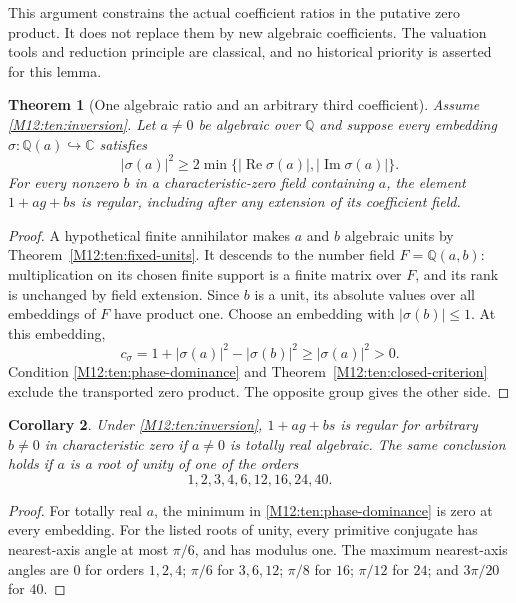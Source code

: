 \documentclass[11pt,a4paper,oneside]{report}
\newtheorem{theorem}{Theorem}[section]
\newtheorem{corollary}[theorem]{Corollary}
\theoremstyle{definition}
\theoremstyle{remark}
\begin{document}
This argument constrains the actual coefficient ratios in the
putative zero product. It does not replace them by new algebraic
coefficients. The valuation tools and reduction principle are
classical, and no historical priority is asserted for this lemma.

\begin{theorem}[One algebraic ratio and an arbitrary third coefficient]
\label{M12:ten:one-ratio}
Assume \eqref{M12:ten:inversion}. Let $a\ne0$ be algebraic over
$\mathbb Q$ and suppose every embedding
$\sigma:\mathbb Q(a)\hookrightarrow\mathbb C$ satisfies
\begin{equation}\label{M12:ten:phase-dominance}
|\sigma(a)|^2\ge
2\min\{|\operatorname{Re}\sigma(a)|,
        |\operatorname{Im}\sigma(a)|\}.
\end{equation}
For every nonzero $b$ in a characteristic-zero field containing
$a$, the element $1+ag+bs$ is regular, including after any extension
of its coefficient field.
\end{theorem}
\begin{proof}
A hypothetical finite annihilator makes $a$ and $b$ algebraic units
by Theorem~\ref{M12:ten:fixed-units}. It descends to the number field
$F=\mathbb Q(a,b)$: multiplication on its chosen finite support
is a finite matrix over $F$, and its rank is unchanged by field
extension. Since $b$ is a unit, its absolute values over all
embeddings of $F$ have product one. Choose an embedding with
$|\sigma(b)|\le1$. At this embedding,
\[
c_\sigma=1+|\sigma(a)|^2-|\sigma(b)|^2
\ge|\sigma(a)|^2>0.
\]
Condition \eqref{M12:ten:phase-dominance} and
Theorem~\ref{M12:ten:closed-criterion} exclude the transported zero
product. The opposite group gives the other side.
\end{proof}

\begin{corollary}\label{M12:ten:ratio-examples}
Under \eqref{M12:ten:inversion}, $1+ag+bs$ is regular for arbitrary
$b\ne0$ in characteristic zero if $a\ne0$ is totally real
algebraic. The same conclusion holds if $a$ is a root of unity of
one of the orders
\[
1,2,3,4,6,12,16,24,40.
\]
\end{corollary}
\begin{proof}
For totally real $a$, the minimum in
\eqref{M12:ten:phase-dominance} is zero at every embedding.
For the listed roots of unity, every primitive conjugate has
nearest-axis angle at most $\pi/6$, and has modulus one.
The maximum nearest-axis angles are $0$ for orders $1,2,4$;
$\pi/6$ for $3,6,12$; $\pi/8$ for $16$; $\pi/12$ for $24$;
and $3\pi/20$ for $40$.
\end{proof}
\end{document}
